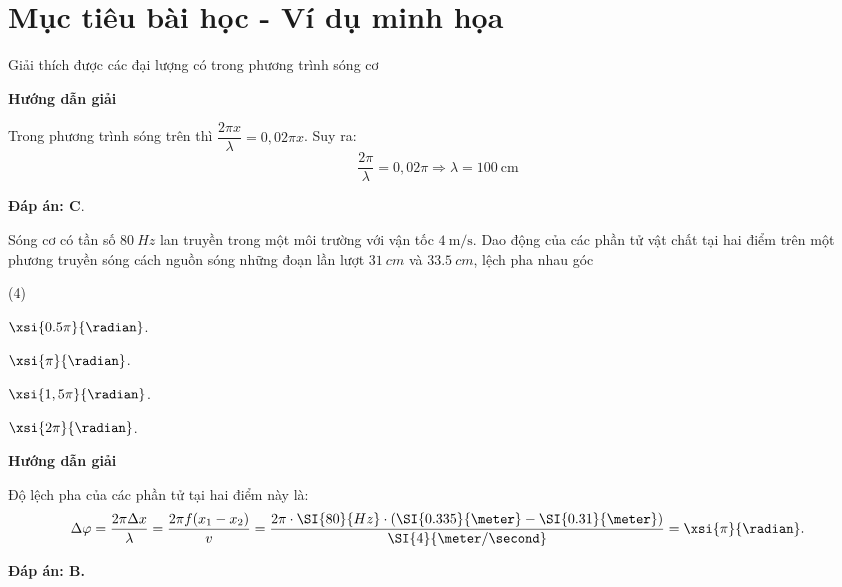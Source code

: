 \section{Mục tiêu bài học - Ví dụ minh họa}
\begin{dang}{Giải thích được các đại lượng có trong phương trình sóng cơ}
	{
		\begin{center}
			\textbf{Hướng dẫn giải}
		\end{center}
		
		Trong phương trình sóng trên thì $\dfrac{2\pi x}{\lambda} = 0,02 \pi x$. Suy ra:
		$$\dfrac{2\pi}{\lambda}=0,02 \pi \Rightarrow \lambda=100\ \text{cm}$$
		
		
		\textbf{Đáp án: C}.
	}
	
	{
		Sóng cơ có tần số $\SI{80}{Hz}$ lan truyền trong một môi trường với vận tốc $\SI{4}{\meter/\second}$. Dao động của các phần tử vật chất tại hai điểm trên một phương truyền sóng cách nguồn sóng những đoạn lần lượt $\SI{31}{cm}$ và $\SI{33.5}{cm}$, lệch pha nhau góc
		\begin{mcq}(4)
			\item $\xsi{0.5\pi}{\radian}$.
			\item $\xsi{\pi}{\radian}$.
			\item $\xsi{1,5\pi}{\radian}$.
			\item $\xsi{2\pi}{\radian}$.
		\end{mcq}
	}{
		\begin{center}
			\textbf{Hướng dẫn giải}
		\end{center}
		
		Độ lệch pha của các phần tử tại hai điểm này là:
		$$\Delta \varphi =\frac{2\pi \Delta x}{\lambda }=\frac{2\pi f (x_1-x_2)}{v}=\frac{2\pi \cdot\SI{80}{Hz}\cdot(\SI{0.335}{\meter}-\SI{0.31}{\meter})}{\SI{4}{\meter/\second}}=\xsi{\pi}{\radian}.$$
		
		\textbf{Đáp án: B.}
	}
	
\end{dang}
